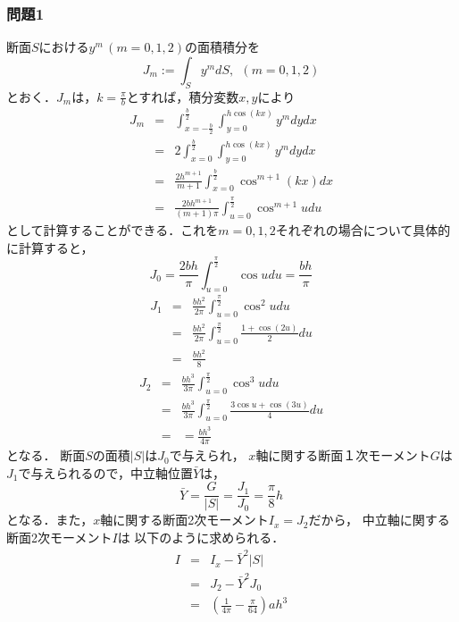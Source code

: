 \documentclass[10pt,a4j]{jarticle}
\begin{document}
\subsubsection*{問題1}
断面$S$における$y^m\,(m=0,1,2)$の面積積分を
\begin{equation}
	J_m:=\int_S y^m dS, \ \ (m=0,1,2)
\end{equation}
とおく．$J_m$は，$k=\frac{\pi}{b}$とすれば，積分変数$x,y$により
\begin{eqnarray}
	J_m 
	&=& 
	\int_{x=-\frac{b}{2}}^{\frac{b}{2}} \int_{y=0}^{h\cos(kx)}y^m dydx \\
	&=& 
	2\int_{x=0}^{\frac{b}{2}} \int_{y=0}^{h\cos(kx)}y^m dydx \\
	&=& 
	\frac{2h^{m+1}}{m+1}\int_{x=0}^{\frac{b}{2}} \cos^{m+1}(kx)dx \\
	&=& 
	\frac{2bh^{m+1}}{(m+1)\pi}\int_{u=0}^{\frac{\pi}{2}} \cos^{m+1}u du
\end{eqnarray}
として計算することができる．これを$m=0,1,2$それぞれの場合について具体的に計算すると，
\begin{equation}
	J_0=
	\frac{2bh}{\pi}\int_{u=0}^{\frac{\pi}{2}} \cos u du = \frac{bh}{\pi}
\end{equation}
\begin{eqnarray}
	J_1
	&=&
	\frac{bh^2}{2\pi}\int_{u=0}^{\frac{\pi}{2}} \cos^2 u du \\
	&=&
	\frac{bh^2}{2\pi}\int_{u=0}^{\frac{\pi}{2}} \frac{1+\cos(2u)}{2} du \\
	&=& \frac{bh^2}{8}
\end{eqnarray}
\begin{eqnarray}
	J_2
	&=&
	\frac{bh^3}{3\pi}\int_{u=0}^{\frac{\pi}{2}} \cos^3 u du \\
	&=&
	\frac{bh^3}{3\pi}\int_{u=0}^{\frac{\pi}{2}} \frac{3\cos u + \cos (3u) }{4} du \\
	&=&
	=\frac{bh^3}{4\pi}
\end{eqnarray}
となる．
断面$S$の面積$\left| S \right|$は$J_0$で与えられ，
$x$軸に関する断面１次モーメント$G$は$J_1$で与えられるので，中立軸位置$\bar Y$は，
\begin{equation}
	\bar Y =\frac{G}{\left| S\right|}=\frac{J_1}{J_0}=\frac{\pi}{8}h
\end{equation}
となる．また，$x$軸に関する断面2次モーメント$I_x=J_2$だから，
中立軸に関する断面2次モーメント$I$は
以下のように求められる．
\begin{eqnarray}
	I & =& I_x -\bar Y^2 \left| S\right| \\
	&=& J_2-\bar Y^2 J_0 \\
	&=& \left( \frac{1}{4\pi}-\frac{\pi}{64} \right) ah^3
\end{eqnarray}
\end{document}
